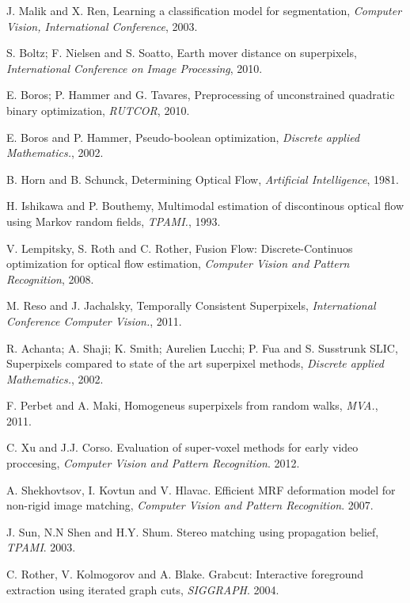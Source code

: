 \begin{thebibliography}{99}

J. Malik and X. Ren, Learning a classification model for segmentation, {\it Computer Vision, International Conference}, 2003.

S. Boltz; F. Nielsen and S. Soatto, Earth mover distance on superpixels, {\it International Conference on Image Processing}, 2010.

E. Boros; P. Hammer and G. Tavares, Preprocessing of unconstrained quadratic binary optimization, {\it RUTCOR}, 2010.

E. Boros and P. Hammer, Pseudo-boolean optimization, {\it Discrete applied Mathematics.}, 2002.

B. Horn and B. Schunck, Determining Optical Flow, {\it Artificial Intelligence}, 1981.

H. Ishikawa and P. Bouthemy, Multimodal estimation of discontinous optical flow using Markov random fields, {\it TPAMI.}, 1993.

V. Lempitsky, S. Roth and C. Rother, Fusion Flow: Discrete-Continuos optimization for optical flow estimation, {\it Computer Vision and Pattern Recognition}, 2008.

M. Reso and J. Jachalsky, Temporally Consistent Superpixels, {\it International Conference Computer Vision.}, 2011.

R. Achanta; A. Shaji; K. Smith; Aurelien Lucchi; P. Fua and S. Susstrunk SLIC, Superpixels compared to state of the art superpixel methods, {\it Discrete applied Mathematics.}, 2002.

F. Perbet and A. Maki, Homogeneus superpixels from random walks, {\it MVA.}, 2011.

C. Xu and J.J. Corso. Evaluation of super-voxel methods for early video proccesing, {\it Computer Vision and Pattern Recognition}. 2012.

A. Shekhovtsov, I. Kovtun and V. Hlavac. Efficient MRF deformation model for non-rigid image matching, {\it Computer Vision and Pattern Recognition}. 2007.

J. Sun, N.N Shen and H.Y. Shum. Stereo matching using propagation belief, {\it TPAMI}. 2003.

C. Rother, V. Kolmogorov and A. Blake. Grabcut: Interactive foreground extraction using iterated graph cuts, {\it SIGGRAPH}. 2004.


\end{thebibliography}

